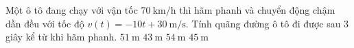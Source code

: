 \begin{ex}%
	Một ô tô đang chạy với  vận tốc $70~\mathrm{km/h}$ thì hãm phanh và chuyển động chậm dần đều với tốc độ $v\left(t \right)=-10t+30~\mathrm{m/s}$. Tính quãng đường ô tô đi được sau $3$ giây kể từ khi hãm phanh.
	\choice 
		 {$51~\mathrm{m}$}
		{$43~\mathrm{m}$} 
		{$54~\mathrm{m}$} 
		{\True $45~\mathrm{m}$} 
\end{ex}

